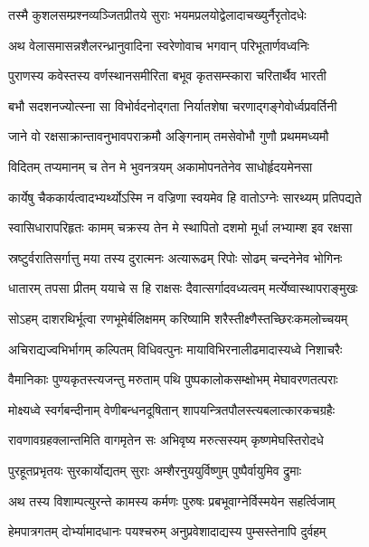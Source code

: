 \twolineshloka
{तस्मै कुशलसम्प्रश्नव्यञ्जितप्रीतये सुराः}
{भयमप्रलयोद्वेलादाचख्युर्नैरृतोदधेः} %

\twolineshloka
{अथ वेलासमासन्नशैलरन्ध्रानुवादिना}
{स्वरेणोवाच भगवान् परिभूतार्णवध्वनिः} %

\twolineshloka
{पुराणस्य कवेस्तस्य वर्णस्थानसमीरिता}
{बभूव कृतसम्स्कारा चरितार्थैव भारती} %

\twolineshloka
{बभौ सदशनज्योत्स्ना सा विभोर्वदनोद्गता}
{निर्यातशेषा चरणाद्गङ्गेवोर्ध्वप्रवर्तिनी} %

\twolineshloka
{जाने वो रक्षसाक्रान्तावनुभावपराक्रमौ}
{अङ्गिनाम् तमसेवोभौ गुणौ प्रथममध्यमौ} %

\twolineshloka
{विदितम् तप्यमानम् च तेन मे भुवनत्रयम्}
{अकामोपनतेनेव साधोर्हृदयमेनसा} %

\twolineshloka
{कार्येषु चैककार्यत्वादभ्यर्थ्योऽस्मि न वज्रिणा}
{स्वयमेव हि वातोऽग्नेः सारथ्यम् प्रतिपद्यते} %

\twolineshloka
{स्वासिधारापरिहृतः कामम् चक्रस्य तेन मे}
{स्थापितो दशमो मूर्धा लभ्याम्श इव रक्षसा} %

\twolineshloka
{स्रष्टुर्वरातिसर्गात्तु मया तस्य दुरात्मनः}
{अत्यारूढम् रिपोः सोढम् चन्दनेनेव भोगिनः} %

\twolineshloka
{धातारम् तपसा प्रीतम् ययाचे स हि राक्षसः}
{दैवात्सर्गादवध्यत्वम् मर्त्येष्वास्थापराङ्मुखः} %

\twolineshloka
{सोऽहम् दाशरथिर्भूत्वा रणभूमेर्बलिक्षमम्}
{करिष्यामि शरैस्तीक्ष्णैस्तच्छिरःकमलोच्चयम्} %

\twolineshloka
{अचिराद्यज्वभिर्भागम् कल्पितम् विधिवत्पुनः}
{मायाविभिरनालीढमादास्यध्वे निशाचरैः} %

\twolineshloka
{वैमानिकाः पुण्यकृतस्त्यजन्तु मरुताम् पथि}
{पुष्पकालोकसम्क्षोभम् मेघावरणतत्पराः} %

\twolineshloka
{मोक्ष्यध्वे स्वर्गबन्दीनाम् वेणीबन्धनदूषितान्}
{शापयन्त्रितपौलस्त्यबलात्कारकचग्रहैः} %

\twolineshloka
{रावणावग्रहक्लान्तमिति वागमृतेन सः}
{अभिवृष्य मरुत्सस्यम् कृष्णमेघस्तिरोदधे} %

\twolineshloka
{पुरहूतप्रभृतयः सुरकार्योद्यतम् सुराः}
{अम्शैरनुययुर्विष्णुम् पुष्पैर्वायुमिव द्रुमाः} %

\twolineshloka
{अथ तस्य विशाम्पत्युरन्ते कामस्य कर्मणः}
{पुरुषः प्रबभूवाग्नेर्विस्मयेन सहर्त्विजाम्} %

\twolineshloka
{हेमपात्रगतम् दोर्भ्यामादधानः पयश्चरुम्}
{अनुप्रवेशादाद्यस्य पुम्सस्तेनापि दुर्वहम्} %

